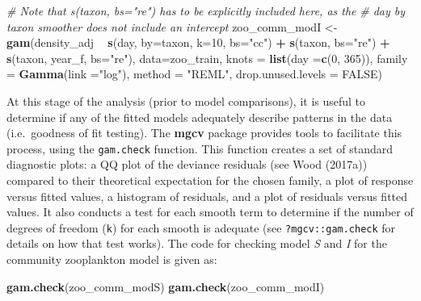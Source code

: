 \documentclass[12pt]{article}
\newenvironment{Shaded}{\begin{snugshade}}{\end{snugshade}}
\newcommand{\KeywordTok}[1]{\textcolor[rgb]{0.13,0.29,0.53}{\textbf{#1}}}
\newcommand{\DataTypeTok}[1]{\textcolor[rgb]{0.13,0.29,0.53}{#1}}
\newcommand{\DecValTok}[1]{\textcolor[rgb]{0.00,0.00,0.81}{#1}}
\newcommand{\StringTok}[1]{\textcolor[rgb]{0.31,0.60,0.02}{#1}}
\newcommand{\CommentTok}[1]{\textcolor[rgb]{0.56,0.35,0.01}{\textit{#1}}}
\newcommand{\OtherTok}[1]{\textcolor[rgb]{0.56,0.35,0.01}{#1}}
\newcommand{\OperatorTok}[1]{\textcolor[rgb]{0.81,0.36,0.00}{\textbf{#1}}}
\newcommand{\NormalTok}[1]{#1}
\begin{document}
\begin{Shaded}
\begin{Highlighting}[]
\CommentTok{# Note that  s(taxon, bs="re") has to be explicitly included here, as the }
\CommentTok{# day  by taxon smoother does not include an intercept}
\NormalTok{zoo_comm_modI <-}\StringTok{ }\KeywordTok{gam}\NormalTok{(density_adj }\OperatorTok{~}\StringTok{ }\KeywordTok{s}\NormalTok{(day, }\DataTypeTok{by=}\NormalTok{taxon,}
                                     \DataTypeTok{k=}\DecValTok{10}\NormalTok{, }\DataTypeTok{bs=}\StringTok{"cc"}\NormalTok{) }\OperatorTok{+}\StringTok{ }
\StringTok{                                   }\KeywordTok{s}\NormalTok{(taxon, }\DataTypeTok{bs=}\StringTok{"re"}\NormalTok{) }\OperatorTok{+}
\StringTok{                                   }\KeywordTok{s}\NormalTok{(taxon, year_f, }\DataTypeTok{bs=}\StringTok{"re"}\NormalTok{),}
                     \DataTypeTok{data=}\NormalTok{zoo_train,}
                     \DataTypeTok{knots =} \KeywordTok{list}\NormalTok{(}\DataTypeTok{day =}\KeywordTok{c}\NormalTok{(}\DecValTok{0}\NormalTok{, }\DecValTok{365}\NormalTok{)),}
                     \DataTypeTok{family =} \KeywordTok{Gamma}\NormalTok{(}\DataTypeTok{link =}\StringTok{"log"}\NormalTok{), }
                     \DataTypeTok{method =} \StringTok{"REML"}\NormalTok{,}
                     \DataTypeTok{drop.unused.levels =} \OtherTok{FALSE}\NormalTok{)}
\end{Highlighting}
\end{Shaded}

At this stage of the analysis (prior to model comparisons), it is useful
to determine if any of the fitted models adequately describe patterns in
the data (i.e.~goodness of fit testing). The \textbf{mgcv} package
provides tools to facilitate this process, using the \texttt{gam.check}
function. This function creates a set of standard diagnostic plots: a QQ
plot of the deviance residuals (see Wood (2017a)) compared to their
theoretical expectation for the chosen family, a plot of response versus
fitted values, a histogram of residuals, and a plot of residuals versus
fitted values. It also conducts a test for each smooth term to determine
if the number of degrees of freedom (\texttt{k}) for each smooth is
adequate (see \texttt{?mgcv::gam.check} for details on how that test
works). The code for checking model \emph{S} and \emph{I} for the
community zooplankton model is given as:

\begin{Shaded}
\begin{Highlighting}[]
\KeywordTok{gam.check}\NormalTok{(zoo_comm_modS)}
\KeywordTok{gam.check}\NormalTok{(zoo_comm_modI)}
\end{Highlighting}
\end{Shaded}
\end{document}
